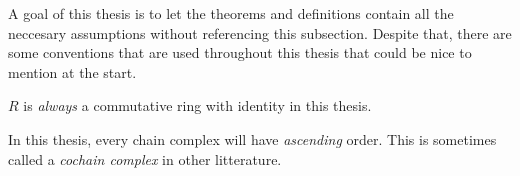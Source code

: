 A goal of this thesis is to let the theorems and definitions contain all the neccesary assumptions without referencing this subsection. Despite that, there are some conventions that are used throughout this thesis that could be nice to mention at the start.

\begin{notation}
    \( R \) is \emph{always} a commutative ring with identity in this thesis.
\end{notation}

\begin{notation}
    In this thesis, every chain complex will have \emph{ascending} order. This is sometimes called a \emph{cochain complex} in other litterature.
\end{notation}
